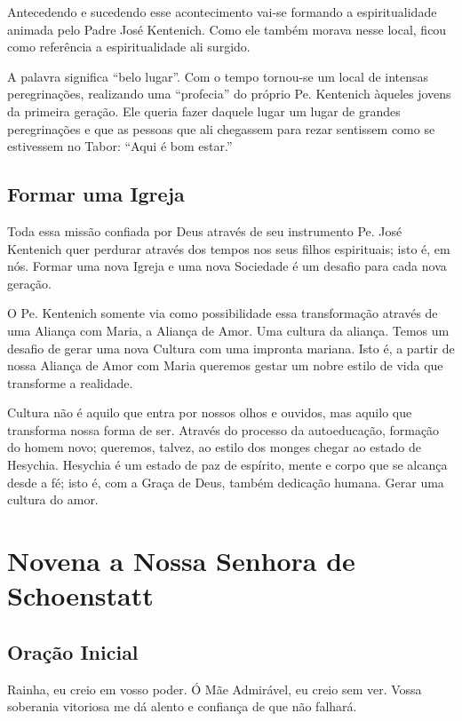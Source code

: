\documentclass[a4paper,14pt]{extarticle} \usepackage[utf8]{inputenc}
\begin{document}
Antecedendo e sucedendo esse acontecimento vai-se formando a espiritualidade animada pelo Padre José Kentenich. Como ele também morava nesse local, ficou como referência a espiritualidade ali surgido.

A palavra significa “belo lugar”. Com o tempo tornou-se um local de intensas peregrinações, realizando uma “profecia” do próprio Pe. Kentenich àqueles jovens da primeira geração. Ele queria fazer daquele lugar um lugar de grandes peregrinações e que as pessoas que ali chegassem para rezar sentissem como se estivessem no Tabor: “Aqui é bom estar.”

\subsection{Formar uma Igreja}

Toda essa missão confiada por Deus através de seu instrumento Pe. José Kentenich quer perdurar através dos tempos nos seus filhos espirituais; isto é, em nós. Formar uma nova Igreja e uma nova Sociedade é um desafio para cada nova geração.

O Pe. Kentenich somente via como possibilidade essa transformação através de uma Aliança com Maria, a Aliança de Amor. Uma cultura da aliança. Temos um desafio de gerar uma nova Cultura com uma impronta mariana. Isto é, a partir de nossa Aliança de Amor com Maria queremos gestar um nobre estilo de vida que transforme a realidade.

Cultura não é aquilo que entra por nossos olhos e ouvidos, mas aquilo que transforma nossa forma de ser. Através do processo da autoeducação, formação do homem novo; queremos, talvez, ao estilo dos monges chegar ao estado de Hesychia. Hesychia é um estado de paz de espírito, mente e corpo que se alcança desde a fé; isto é, com a Graça de Deus, também dedicação humana. Gerar uma cultura do amor.

\newpage

\section{Novena a Nossa Senhora de Schoenstatt}

\subsection{Oração Inicial} \label{oracao-inicial}
Rainha, eu creio em vosso poder. Ó Mãe Admirável, eu creio sem ver.
Vossa soberania vitoriosa me dá alento e confiança de que não falhará.
\end{document}
